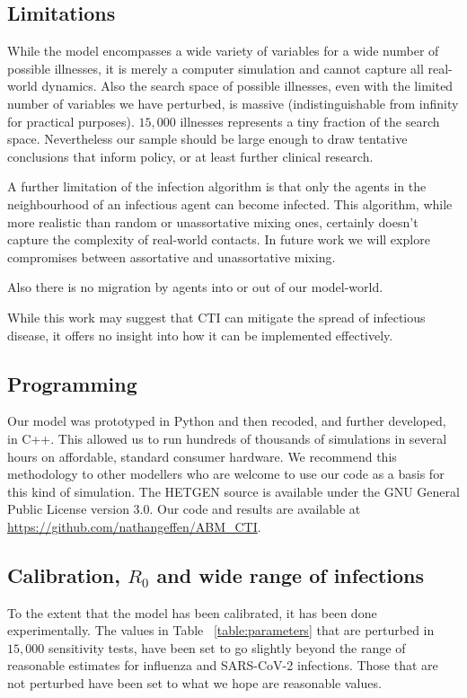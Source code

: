 \documentclass{article}
\begin{document}
\subsection{Limitations}

While the model encompasses a wide variety of variables for a wide number of
possible illnesses, it is merely a computer simulation and cannot capture all
real-world dynamics. Also the search space of possible illnesses, even with the
limited number of variables we have perturbed, is massive (indistinguishable
from infinity for practical purposes). $15,000$ illnesses represents a tiny
fraction of the search space. Nevertheless our sample should be large enough to
draw tentative conclusions that inform policy, or at least further clinical
research.

A further limitation of the infection algorithm is that only the agents in the
neighbourhood of an infectious agent can become infected. This algorithm, while
more realistic than random or unassortative mixing ones, certainly doesn't
capture the complexity of real-world contacts. In future work we will explore
compromises between assortative and unassortative mixing.

Also there is no migration by agents into or out of our model-world.

While this work may suggest that CTI can mitigate the spread of infectious
disease, it offers no insight into how it can be implemented effectively.

\subsection{Programming}

Our model was prototyped in Python and then recoded, and further developed, in
C++. This allowed us to run hundreds of thousands of simulations in several
hours on affordable, standard consumer hardware. We recommend this methodology
to other modellers who are welcome to use our code as a basis for this kind of
simulation. The HETGEN source is available under the GNU General Public License
version 3.0. Our code and results are available at \url{https://github.com/nathangeffen/ABM_CTI}.

\subsection{Calibration, $R_0$ and wide range of infections}

To the extent that the model has been calibrated, it has been done
experimentally. The values in Table ~\ref{table:parameters} that are perturbed
in $15,000$ sensitivity tests, have been set to go slightly beyond the range of
reasonable estimates for influenza and SARS-CoV-2 infections. Those that are not
perturbed have been set to what we hope are reasonable values.
\end{document}

